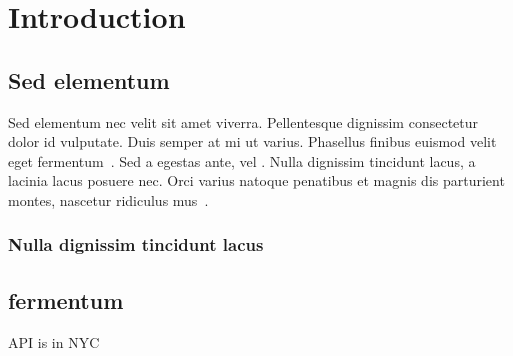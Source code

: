 \chapter{Introduction}
\label{ch:intro}

\section{Sed elementum}\label{sec:sedelemntum}

Sed elementum \autocite{marta_poblet_linked_2017} nec velit sit amet viverra.
Pellentesque dignissim consectetur dolor id vulputate.
Duis semper at mi ut varius.
Phasellus finibus euismod velit eget fermentum~\autocite{jafar_blockchain_2021}.
Sed a egestas ante, vel .
Nulla dignissim tincidunt lacus, a lacinia lacus posuere nec.
Orci varius natoque penatibus et magnis dis parturient montes, nascetur ridiculus mus~\autocite{eggers_no_2021}.

\subsection{Nulla dignissim tincidunt lacus}\label{subsec:nulladinissim}

\lipsum[1-10]

\section{fermentum}\label{sec:fermentum}

\lipsum[1-5]

\Gls{API} is in \Gls{NYC}


